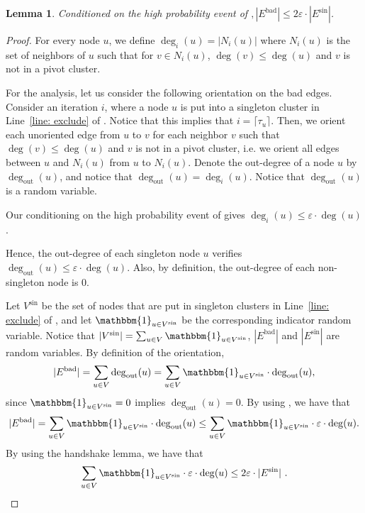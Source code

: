 \documentclass[10pt,a4paper]{article}
\newtheorem{lemma}{Lemma}[section]
\newcommand{\eps}{\ensuremath{\varepsilon}}
\newcommand{\badedges}{\ensuremath{E^{\textrm{bad}}}\xspace}
\newcommand{\singletonedges}{\ensuremath{E^{\textrm{sin}}}\xspace}
\newcommand{\outdeg}{\ensuremath{\deg_{\textrm{out}}}\xspace}
\newcommand{\vsin}{V^\textrm{sin}\xspace}
\begin{document}
 \begin{lemma}\label{lemma: goodedges}
     Conditioned on the high probability event of $, |\badedges| \le 2\eps \cdot |\singletonedges|$.
 \end{lemma}
 \begin{proof}
        For every node $u$, we define $\deg_i(u) = |N_i(u)|$ where $N_i(u)$ is the set of neighbors of $u$ such that for $v \in N_i(u)$, $\deg(v) \leq \deg(u)$ and $v$ is not in a pivot cluster.
 
         For the analysis, let us consider the following orientation on the bad edges.
         Consider an iteration $i$, where a node $u$ is put into a singleton cluster in Line~\ref{line: exclude} of .
         Notice that this implies that $i = \lceil\tau_u\rceil$.
         Then, we orient each unoriented edge from $u$ to $v$ for each neighbor $v$ such that $\deg(v) \leq \deg(u)$ and $v$ is not in a pivot cluster, i.e. we orient all edges between $u$ and $N_i(u)$ from $u$ to $N_i(u)$. 
         Denote the out-degree of a node $u$ by $\outdeg(u)$, and notice that $\outdeg(u) = \deg_i(u)$. 
         Notice that $\outdeg(u)$ is a random variable. 
         
         Our conditioning on the high probability event of  gives $\deg_{i}(u) \le \eps \cdot \deg(u)$. 
        
        Hence, the out-degree of each singleton node $u$ verifies $\outdeg(u) \le \eps \cdot \deg(u)$. 
        Also, by definition, the out-degree of each non-singleton node is $0$. 
         
                
        Let $\vsin$ be the set of nodes that are put in singleton clusters in Line~\ref{line: exclude} of , and let $\mathbbm{1}_{u\in \vsin}$ be the corresponding indicator random variable. 
        Notice that $|\vsin| = \sum_{u\in V}\mathbbm{1}_{u\in \vsin}$, $|\badedges|$ and $|\singletonedges|$ are random variables. 
        By definition of the orientation,
        \[
            |\badedges| = \sum_{u\in V} \outdeg(u) = \sum_{u\in V} \mathbbm{1}_{u\in \vsin}\cdot \outdeg(u),  
        \]
        since $\mathbbm{1}_{u\in \vsin} = 0$ implies $\outdeg(u) = 0$. 
        By using , we have that 
     \[
         |\badedges| = \sum_{u\in V}\mathbbm{1}_{u\in \vsin} \cdot \outdeg(u) \leq \sum_{u\in V} \mathbbm{1}_{u\in \vsin}\cdot \eps \cdot \deg(u) .
     \]       
     By using the handshake lemma, we have that
     \[
        \sum_{u\in V} \mathbbm{1}_{u\in \vsin}\cdot \eps \cdot \deg(u) \leq 2\eps \cdot |\singletonedges| \ . \qedhere
     \]
        
 \end{proof}
\end{document}
